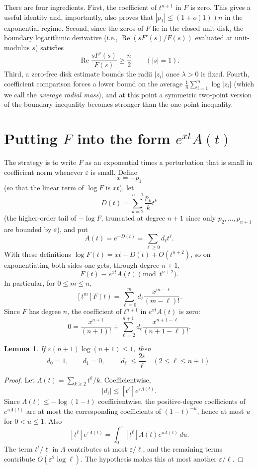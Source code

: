 \documentclass[11pt]{article}
\newtheorem{lemma}[theorem]{Lemma}
\newcommand{\eps}{\varepsilon}
\DeclareMathOperator{\Repart}{Re}
\begin{document}
There are four ingredients.
First, the coefficient of $t^{n+1}$ in $F$ is zero.  This gives a useful
identity and, importantly, also proves that $|p_1|\leq (1+o(1))n$ in the
exponential regime.  Second, since the zeros of $F$ lie in the closed unit
disk, the boundary logarithmic derivative (i.e., $\Repart(sF'(s)/F(s))$
evaluated at unit-modulus $s$) satisfies
\[
        \Repart\frac{sF'(s)}{F(s)}\geq \frac n2\qquad (|s|=1).
\]
Third, a zero-free disk estimate bounds the radii $|z_i|$ once $\lambda>0$
is fixed.  Fourth, coefficient comparison forces a lower bound on the
average $\frac1n\sum_{i=1}^n\log|z_i|$ (which we call the \emph{average
radial mass}), and at this point a symmetric two-point version of the
boundary inequality becomes stronger than the one-point inequality.

\section{\texorpdfstring{Putting $F$ into the form $e^{xt}A(t)$}{Putting F into the form e\^{xt}A(t)}}

The strategy is to write $F$ as an exponential times a perturbation that is
small in coefficient norm whenever $\eps$ is small.  Define
\[
        x=-p_1
\]
(so that the linear term of $\log F$ is $xt$), let
\[
        D(t)=\sum_{k=2}^{n+1}\frac{p_k}{k}t^k
\]
(the higher-order tail of $-\log F$, truncated at degree $n+1$ since only
$p_2,\dots,p_{n+1}$ are bounded by $\eps$), and put
\[
        A(t)=e^{-D(t)}=\sum_{\ell\geq0}d_\ell t^\ell .
\]
With these definitions $\log F(t)=xt-D(t)+O(t^{n+2})$, so on exponentiating
both sides one gets, through degree $n+1$,
\[
        F(t)\equiv e^{xt}A(t) \pmod {t^{n+2}}.
\]
In particular, for $0\leq m\leq n$,
\[
        [t^m]F(t)=\sum_{\ell=0}^m d_\ell\frac{x^{m-\ell}}{(m-\ell)!}.
        \tag{2.1}\label{eq:coeff-formula}
\]
Since $F$ has degree $n$, the coefficient of $t^{n+1}$ in $e^{xt}A(t)$ is
zero:
\[
        0=\frac{x^{n+1}}{(n+1)!}+
        \sum_{\ell=2}^{n+1}d_\ell\frac{x^{n+1-\ell}}{(n+1-\ell)!}.
        \tag{2.2}\label{eq:endpoint}
\]

\begin{lemma}\label{lem:dell}
If $\eps(n+1)\log(n+1)\leq1$, then
\[
        d_0=1,
        \qquad d_1=0,
        \qquad |d_\ell|\leq \frac{2\eps}{\ell}
        \quad (2\leq \ell\leq n+1).
\]
\end{lemma}

\begin{proof}
Let $\Lambda(t)=\sum_{k\geq2}t^k/k$.  Coefficientwise,
\[
        |d_\ell|\leq [t^\ell]e^{\eps\Lambda(t)}.
\]
Since $\Lambda(t)\leq -\log(1-t)$ coefficientwise, the positive-degree
coefficients of $e^{u\Lambda(t)}$ are at most the corresponding coefficients
of $(1-t)^{-u}$, hence at most $u$ for $0<u\leq1$.  Also
\[
        [t^\ell]e^{\eps\Lambda(t)}
        =\int_0^\eps [t^\ell]\Lambda(t)e^{u\Lambda(t)}\,du.
\]
The term $t^\ell/\ell$ in $\Lambda$ contributes at most $\eps/\ell$, and
the remaining terms contribute $O(\eps^2\log \ell)$.  The hypothesis makes
this at most another $\eps/\ell$.
\end{proof}
\end{document}
